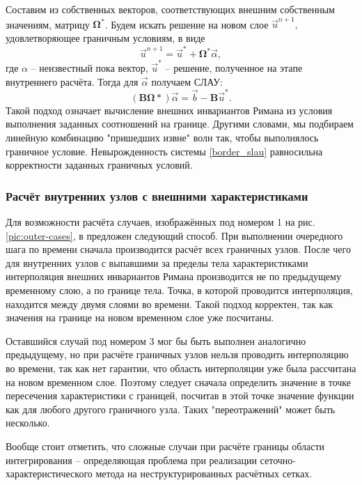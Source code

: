 Составим из собственных векторов, соответствующих внешним собственным значениям, матрицу $\mathbf{\Omega^{*}}$. Будем искать решение на новом слое $\vec{u}^{n+1},$ удовлетворяющее граничным условиям, в виде
\begin{equation}
	\vec{u}^{n+1} = \vec{u}^{*} + \mathbf{\Omega^{*}} \vec{\alpha},
\end{equation}
где $\alpha$ -- неизвестный пока вектор, $\vec{u}^{*}$ -- решение, полученное на этапе внутреннего расчёта. Тогда для $\vec{\alpha}$ получаем СЛАУ:
\begin{equation}
\label{border_slau}
	\left( \mathbf{B} \mathbf{\Omega*} \right) \vec{\alpha} = \vec{b} -  \mathbf{B} \vec{u}^{*}.
\end{equation}
Такой подход означает вычисление внешних инвариантов Римана из условия выполнения заданных соотношений на границе. Другими словами, мы подбираем линейную комбинацию "пришедших извне"\space{} волн так, чтобы выполнялось граничное условие.
Невырожденность системы \eqref{border_slau} равносильна корректности заданных граничных условий.


\subsubsection{Расчёт внутренних узлов с внешними характеристиками}
Для возможности расчёта случаев, изображённых под номером 1 на рис. \ref{pic:outer-cases}, в \cite{magomedov_kholodov_1988} предложен следующий способ. При выполнении  очередного шага по времени сначала производится расчёт всех граничных узлов. После чего для внутренних узлов с выпавшими за пределы тела характеристиками интерполяция внешних инвариантов Римана производится не по предыдущему временному слою, а по границе тела. Точка, в которой проводится интерполяция, находится между двумя слоями во времени. Такой подход корректен, так как значения на границе на новом временном слое уже посчитаны.

Оставшийся случай под номером 3 мог бы быть выполнен аналогично предыдущему, но при расчёте граничных узлов нельзя проводить интерполяцию во времени, так как нет гарантии, что область интерполяции уже была рассчитана на новом временном слое. Поэтому следует сначала определить значение в точке пересечения характеристики с границей, посчитав в этой точке значение функции как для любого другого граничного узла. Таких "переотражений"\space{} может быть несколько.

Вообще стоит отметить, что сложные случаи при расчёте границы области интегрирования -- определяющая проблема при реализации сеточно\hyp{}характеристического метода на неструктурированных расчётных сетках.




